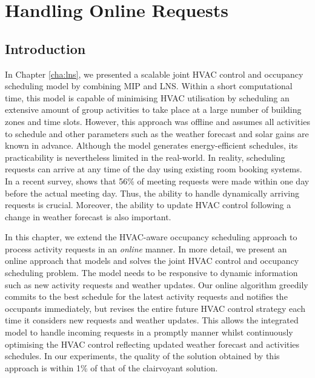 

\chapter{Handling Online Requests}
\label{cha:online}

\section{Introduction}

In Chapter \ref{cha:lns}, we presented a scalable joint HVAC control and occupancy scheduling model by combining MIP and LNS. Within a short computational time, this model is capable of minimising HVAC utilisation by scheduling an extensive amount of group activities to take place at a large number of building zones and time slots.
However, this approach was offline and assumes all activities to schedule and other parameters such as the weather forecast and solar gains are known in advance. Although the model generates energy-efficient schedules, its practicability is nevertheless limited in the real-world. In reality, scheduling requests can arrive at any time of the day using existing room booking systems. 
In a recent survey, \cite{kwak2013tesla} shows that 56\% of meeting requests were made within one day before the actual meeting day. Thus, the ability to handle dynamically arriving requests is crucial. Moreover, the ability to update HVAC control following a change in weather forecast is also important. 

In this chapter, we extend the HVAC-aware occupancy scheduling approach to process activity requests in an \textsl{online} manner. In more detail, we present an online approach that models and solves the joint HVAC control and occupancy scheduling problem. The model needs to be responsive to dynamic information such as new activity requests and weather updates. Our online algorithm greedily commits to the best schedule for the latest activity requests and notifies the occupants immediately, but revises the entire future HVAC control strategy each time it considers new requests and weather updates. This allows the integrated model to handle incoming requests in a promptly manner whilst continuously optimising the HVAC control reflecting updated weather forecast and activities schedules. In our experiments, the quality of the solution obtained by this approach is within 1\% of that of the clairvoyant solution. 

